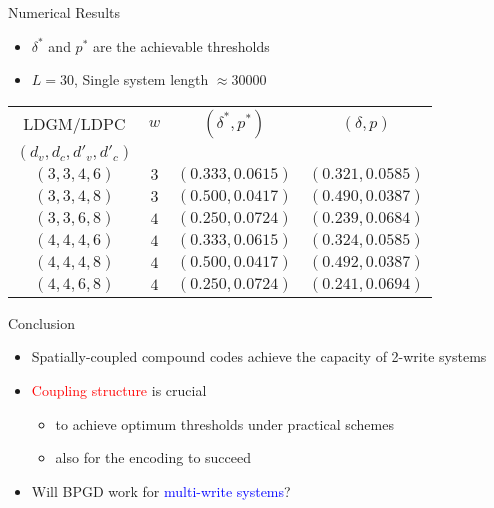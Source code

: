 \documentclass{beamer}
\newlength{\threecolwid}
\newlength{\itemspace}
\newlength{\subitemspace}
\begin{document}
\begin{frame}
\begin{columns}[t]
\begin{column}{\threecolwid}
\begin{block}{Numerical Results}
\begin{itemize}
\vspace{\subitemspace}
\begin{itemize}
\item $\delta^{*}$ and $p^{*}$ are the achievable thresholds
\item $L=30$, Single system length $\approx 30000$
\end{itemize}
\vspace{\subitemspace}
  \begin{center}
    \begin{tabular}{|c|c|c|c|}
      \hline
      LDGM/LDPC & $w$ & $(\delta^{*},p^*)$ & $(\delta,p)$ \\
      $(d_v,d_c,d'_v,d'_c)$ &  &  & \\
      \hline
      $(3,3,4,6)$ & $3$ & $(0.333,0.0615)$ & $(0.321,0.0585)$ \\
      $(3,3,4,8)$ & $3$ & $(0.500,0.0417)$ & $(0.490,0.0387)$ \\
      $(3,3,6,8)$ & $4$ & $(0.250,0.0724)$ & $(0.239,0.0684)$ \\
      $(4,4,4,6)$ & $4$ & $(0.333,0.0615)$ & $(0.324,0.0585)$ \\
      $(4,4,4,8)$ & $4$ & $(0.500,0.0417)$ & $(0.492,0.0387)$ \\
      $(4,4,6,8)$ & $4$ & $(0.250,0.0724)$ & $(0.241,0.0694)$ \\
      \hline  
    \end{tabular}
  \end{center}

\end{itemize}
\end{block}


    \vspace{2.5cm}
\begin{alertblock}{Conclusion}
        \begin{itemize}
    \item Spatially-coupled compound codes achieve the capacity of 2-write systems \vspace{0.2cm}
    \item \vspace{\itemspace}\textcolor{red}{Coupling structure} is crucial 
      \begin{itemize}
      \item to achieve optimum thresholds under practical schemes 
      \item also for the encoding to succeed 
      \end{itemize}
    \item \vspace{\itemspace} Will BPGD work for \textcolor{blue}{multi-write systems}?
    \end{itemize}
\end{alertblock}


\end{column}
\end{columns}
\end{frame}
\end{document}
